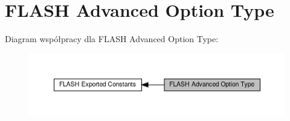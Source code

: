 \hypertarget{group___f_l_a_s_h_ex___advanced___option___type}{}\section{F\+L\+A\+SH Advanced Option Type}
\label{group___f_l_a_s_h_ex___advanced___option___type}
Diagram współpracy dla F\+L\+A\+SH Advanced Option Type\+:\nopagebreak
\begin{figure}[H]
\begin{center}
\leavevmode
\includegraphics[width=350pt]{group___f_l_a_s_h_ex___advanced___option___type}
\end{center}
\end{figure}
